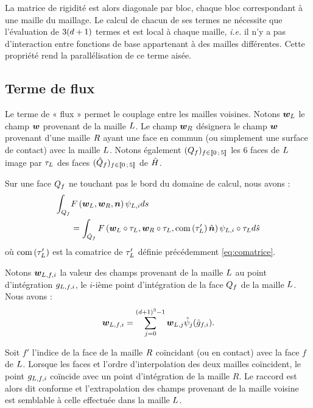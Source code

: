 La matrice de rigidité est alors diagonale par bloc, chaque bloc correspondant
à une maille du maillage. Le calcul de chacun de ses termes ne nécessite que
l’évaluation de $3 (d + 1)$ termes et est local à chaque maille, \textit{i.e.}
il n’y a pas d’interaction entre fonctions de base appartenant à des mailles
différentes. Cette propriété rend la parallélisation de ce terme aisée.
\\


\subsection{Terme de flux}
\label{ssect:terme_de_flux}

Le terme de « flux » permet le couplage entre les mailles voisines. Notons $\bm{w}_L$
le champ $\bm{w}$ provenant de la maille $L$. Le champ $\bm{w}_R$ désignera le champ
$\bm{w}$ provenant d’une maille $R$ ayant une face en commun (ou simplement
une surface de contact) avec la maille $L$.
Notons également $(Q_f)_{f \in \lbrack\!\lbrack0\,;\,5\rbrack\!\rbrack}$ les $6$ faces de
$L$ image par $\tau_{L}$ des faces $(\hat{Q}_f)_{f \in \lbrack\!\lbrack0\,;\,5\rbrack\!\rbrack}$
de $\hat{H}$.

Sur une face $Q_f$ ne touchant pas le bord du domaine de calcul,
nous avons :
\begin{equation}
	\begin{aligned}
		\int_{Q_f} &F\left(\bm{w}_L,\bm{w}_R,\bm{n}\right) \psi_{L,i} ds \\
		&= \int_{\hat{Q}_f}
			F\left(\bm{w}_L \circ \tau_{L},\bm{w}_R \circ \tau_{L},
				\mathrm{com}\left(\tau_{L}'\right) \hat{\bm{n}}\right)
			\psi_{L,i} \circ \tau_{L} d\hat{s}
	\end{aligned}
\end{equation}
où $\mathrm{com}\left(\tau_{L}'\right)$ est la comatrice de $\tau_{L}'$ définie
précédemment \eqref{eq:comatrice}.


Notons $\bm{w}_{L,f,i}$ la valeur des champs provenant de la maille $L$
au point d'intégration $g_{L,f,i}$, le $i$-ième point d'intégration de la face
$Q_f$ de la maille $L$. Nous avons :
\begin{align}
	\bm{w}_{L,f,i} = \sum_{j=0}^{(d + 1)^3 - 1}
	\bm{w}_{L,j} \hat{\psi}_{j} (\hat{g}_{f,i}) .
\end{align}

Soit $f'$ l’indice de la face de la maille $R$ coïncidant (ou en contact) avec la face $f$ de $L$.
Lorsque les faces et l'ordre d'interpolation des deux mailles coïncident,
le point $g_{L,f,i}$ coïncide avec un point
d'intégration de la maille $R$. Le raccord est alors dit conforme et
l'extrapolation des champs provenant de la maille voisine est
semblable à celle effectuée dans la maille $L$.

